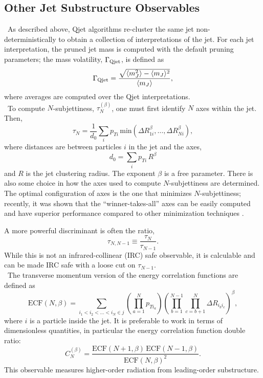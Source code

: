 \subsection{Other Jet Substructure Observables}

~As described above, Qjet algorithms re-cluster the same jet non-deterministically to obtain a collection of interpretations of the jet. For each jet interpretation, the pruned jet mass is computed with the default pruning parameters; the mass volatility, $\Gamma_{\rm Qjet}$, is defined as
%
\begin{equation}
\Gamma_{\rm Qjet} = \frac{\sqrt{\langle m_J^2 \rangle-\langle m_J\rangle^2}}{\langle m_J\rangle},
\end{equation}
%
where averages are computed over the Qjet interpretations.\\

~To compute $N$-subjettiness, $\tau_N^{(\beta)}$, one must first identify $N$ axes within the jet. Then,
%
\begin{equation}
\tau_N = \frac{1}{d_0} \sum_i p_{Ti} \,\mathrm{min}\left( \Delta R_{1i}^\beta,\ldots,\Delta R_{Ni}^\beta\right),
\end{equation}
%
where distances are between particles $i$ in the jet and the axes,
%
\begin{equation}
d_0 = \sum_i p_{Ti}\,R^\beta
\end{equation}
%
and $R$ is the jet clustering radius. The exponent $\beta$ is a free parameter. There is also some choice in how the axes used to compute $N$-subjettiness are determined. The optimal configuration of axes is the one that minimizes
$N$-subjettiness; recently, it was shown that the ``winner-takes-all'' axes can be easily computed and have superior performance compared to other minimization techniques \cite{}. 

A more powerful discriminant is often the ratio,
%
\begin{equation}
\tau_{N,N-1} \equiv \frac{\tau_N}{\tau_{N-1}}.
\end{equation}
%
While this is not an infrared-collinear (IRC) safe observable, it is calculable \cite{} and can be made IRC safe with a loose cut on $\tau_{N-1}$.\\


~The transverse momentum version of the energy correlation functions are defined as \cite{}
%
\begin{equation}
\mathrm{ECF}(N,\beta) = \sum_{i_1 < i_2<\ldots<i_N \in j} \left(\prod_{a=1}^N p_{T i_a}\right)\left( \prod_{b=1}^{N-1} \prod_{c=b+1}^N \Delta R_{i_b i_c}\right)^\beta,
\end{equation}
%
where $i$ is a particle inside the jet. It is preferable to work in terms of dimensionless quantities, in particular the energy correlation function double ratio:
%
\begin{equation}
C_N^{(\beta)} = \frac{\mathrm{ECF}(N+1,\beta)\,\mathrm{ECF}(N-1,\beta)}{\mathrm{ECF}(N,\beta)^2}.
\end{equation}
%
This observable measures higher-order radiation from leading-order substructure.

